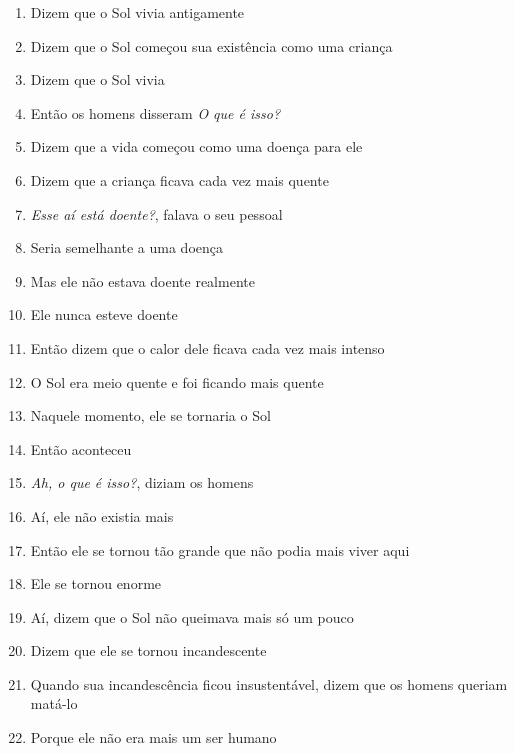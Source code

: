 \begin{enumerate}
\item Dizem que o Sol vivia antigamente
\item Dizem que o Sol começou sua existência como uma criança
\item Dizem que o Sol vivia

\begin{center}\end{center}

\item Então os homens disseram \textit{O que é isso?}
\item Dizem que a vida começou como uma doença para ele
\item Dizem que a criança ficava cada vez mais quente

\begin{center}\end{center}

\item \textit{Esse aí está doente?}, falava o seu pessoal
\item Seria semelhante a uma doença
\item Mas ele não estava doente realmente
\item Ele nunca esteve doente

\begin{center}\end{center}

\item Então dizem que o calor dele ficava cada vez mais intenso
\item O Sol era meio quente e foi ficando mais quente
\item Naquele momento, ele se tornaria o Sol

\begin{center}\end{center}

\item Então aconteceu
\item \textit{Ah, o que é isso?}, diziam os homens
\item Aí, ele não existia mais
\item Então ele se tornou tão grande que não podia mais viver aqui
\item Ele se tornou enorme

\begin{center}\end{center}

\item Aí, dizem que o Sol não queimava mais só um pouco
\item Dizem que ele se tornou incandescente
\item Quando sua incandescência ficou insustentável, dizem que os homens
queriam matá-lo
\item Porque ele não era mais um ser humano


\end{enumerate}
